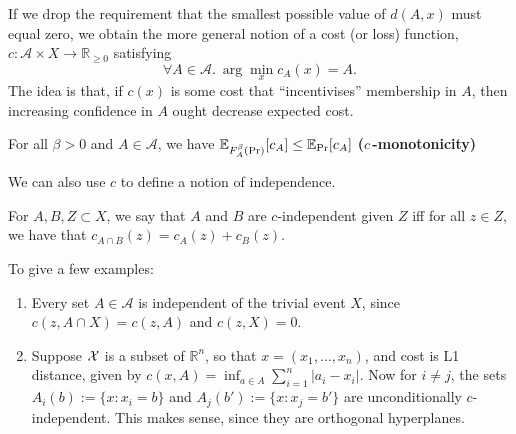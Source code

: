 \documentclass{article}
\begin{document}
\begin{wip}
If we drop the requirement that the smallest possible value of $d(A,x)$ must equal zero, we obtain the more general notion of a cost (or loss) function, $c :\mathcal A \times X \to \mathbb R_{\ge 0}$ satisfying
\[
\forall A \in \mathcal A.~\arg\min_{x} c_A(x) = A.
\]
The idea is that, if $c(x)$ is some cost that ``incentivises'' membership in $A$, then increasing confidence in $A$ ought decrease expected cost.
\begin{URaxioms}
    \item For all $\beta > 0$ and $A\in\mathcal A$, we have
    $\operatorname*{\mathbb{E}}_{F^{\beta}_A(\Pr)} [ c_A ]
        \le
        \operatorname*{\mathbb{E}}_{\Pr}[ c_A ]
    $
        \hfill \textbf{($c$\,-monotonicity)}
\end{URaxioms}


We can also use $c$ to define a notion of independence.

\begin{defn}[$c$-independence]
For $A,B,Z \subset X$,
we say that $A$ and $B$ are $c$-independent given $Z$ iff
for all $z \in Z$, we have that
$c_{A\cap B}(z) = c_{A}(z) + c_{B}(z)$.
\end{defn}

To give a few examples:
\begin{enumerate}
    \item Every set $A \in\mathcal A$ is independent of the trivial event $X$, since
        $
            c(z, A\cap X) = c(z, A)
        $
        and $c(z, X) = 0$.
    \item Suppose $\mathcal X$ is a subset of $\mathbb R^n$, so that $x = (x_1, \ldots, x_n)$, and cost is L1 distance, given by $c(x,A) = \inf_{a \in A} \sum_{i=1}^n {|a_i - x_i|}$. Now for $i\ne j$,
    the sets $A_i(b) := \{ x : x_i = b \}$
    and $A_j(b') := \{x : x_j = b' \}$ are unconditionally $c$-independent.
    This makes sense, since they are orthogonal hyperplanes.


\end{enumerate}
\end{wip}
\end{document}
